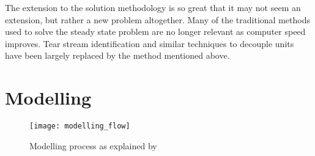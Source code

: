 The extension to the solution methodology is so great that it may not seem an extension, but rather a new problem altogether.  
Many of the traditional methods used to solve the steady state problem are no longer relevant as computer speed improves.  
Tear stream identification and similar techniques to decouple units have been largely replaced by the method mentioned above.

\section{Modelling}
\begin{figure}[htp]
  \centering
  \texttt{[image: modelling\_flow]}
  \caption[Modelling process]{Modelling process as explained by \citet{biezczad}}
  \label{fig:modellingprocess}
\end{figure}


